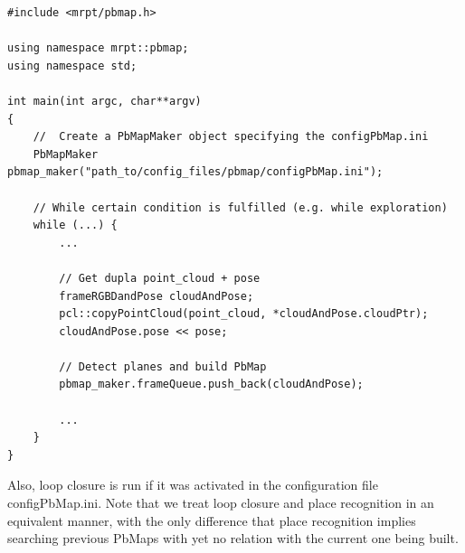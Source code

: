 \documentclass[a4paper,11pt]{article}
\begin{document}
\begin{lstlisting}
#include <mrpt/pbmap.h>

using namespace mrpt::pbmap;
using namespace std;

int main(int argc, char**argv)
{
	//  Create a PbMapMaker object specifying the configPbMap.ini
	PbMapMaker pbmap_maker("path_to/config_files/pbmap/configPbMap.ini"); 
	
	// While certain condition is fulfilled (e.g. while exploration)
	while (...) {
		...

		// Get dupla point_cloud + pose
		frameRGBDandPose cloudAndPose;
		pcl::copyPointCloud(point_cloud, *cloudAndPose.cloudPtr);
		cloudAndPose.pose << pose;

		// Detect planes and build PbMap
		pbmap_maker.frameQueue.push_back(cloudAndPose);

		...
	}
}
\end{lstlisting}

Also, loop closure is run if it was activated in the configuration file  configPbMap.ini. Note that we treat loop closure and place recognition in an equivalent manner, with the only difference that place recognition implies searching previous PbMaps with yet no relation with the current one being built.




\end{document}
